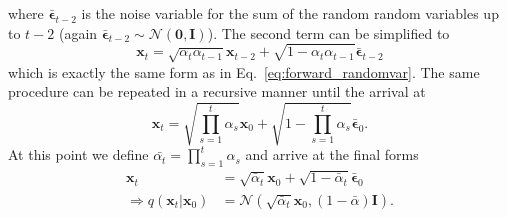 where $\bm{\bar{\epsilon}}_{t-2}$ is the noise variable for the sum of the random random variables up to $t-2$ (again $\bm{\bar{\epsilon}}_{t-2} \sim \mathcal{N}(\bm{0}, \bm{I})$). The second term can be simplified to
\begin{equation}
    \bm{x}_t = \sqrt{\alpha_{t}\alpha_{t-1}} \bm{x}_{t-2} + \sqrt{1-\alpha_t\alpha_{t-1}} \bm{\bar{\epsilon}}_{t-2}
\end{equation}
which is exactly the same form as in Eq.~\ref{eq:forward_randomvar}. The same procedure can be repeated in a recursive manner until the arrival at
\begin{equation}
    \bm{x}_t = \sqrt{\prod_{s=1}^{t}\alpha_s} \bm{x}_{0} + \sqrt{1-\prod_{s=1}^{t}\alpha_s} \bm{\bar{\epsilon}}_{0}.
\end{equation}
At this point we define $\bar{\alpha_t} = \prod_{s=1}^{t}\alpha_s$ and arrive at the final forms
\begin{align}
    \bm{x}_t                           & = \sqrt{\bar{\alpha}_{t}} \bm{x}_{0} + \sqrt{1-\bar{\alpha}_{t}} \bm{\bar{\epsilon}}_{0} \\
    \Rightarrow q(\bm{x}_t|\bm{x}_{0}) & = \mathcal{N}(\sqrt{\bar{\alpha}_t} \bm{x}_{0}, (1-\bar{\alpha}) \bm{I}).
\end{align}

